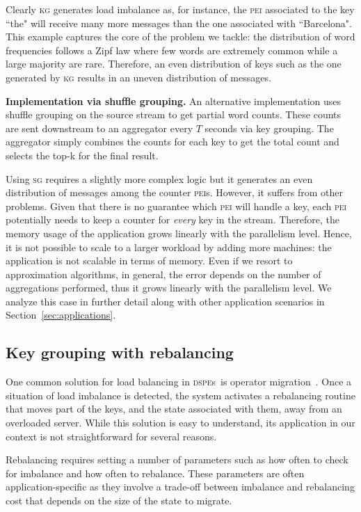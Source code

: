 \documentclass[10pt,conference,letterpaper]{IEEEtran}
\newcommand{\spara}[1]{\smallskip\noindent\textbf{#1}}
\newcommand{\pei}{\textsc{pei}\xspace}
\newcommand{\peis}{{\pei}s\xspace}
\newcommand{\dspe}{\textsc{dspe}\xspace}
\newcommand{\dspes}{{\dspe}s\xspace}
\newcommand{\kg}{\textsc{kg}\xspace}
\newcommand{\sg}{\textsc{sg}\xspace}
\begin{document}
Clearly \kg generates load imbalance as, for instance, the \pei associated to the key ``the" will receive many more messages than the one associated with ``Barcelona".
This example captures the core of the problem we tackle: the distribution of word frequencies follows a Zipf law where few words are extremely common while a large majority are rare.
Therefore, an even distribution of keys such as the one generated by \kg results in an uneven distribution of messages.

\spara{Implementation via shuffle grouping.} An alternative implementation uses shuffle grouping on the source stream to get partial word counts.
These counts are sent downstream to an aggregator every $T$ seconds via key grouping.
The aggregator simply combines the counts for each key to get the total count and selects the top-k for the final result.


Using \sg requires a slightly more complex logic but it generates an even distribution of messages among the counter \peis.
However, it suffers from other problems.
Given that there is no guarantee which \pei will handle a key, each \pei potentially needs to keep a counter for \emph{every} key in the stream.
Therefore, the memory usage of the application grows linearly with the parallelism level.
Hence, it is not possible to scale to a larger workload by adding more machines: the application is not scalable in terms of memory.
Even if we resort to approximation algorithms, in general, the error depends on the number of aggregations performed, thus it grows linearly with the parallelism level.
We analyze this case in further detail along with other application scenarios in Section~\ref{sec:applications}.



\subsection{Key grouping with rebalancing}
One common solution for load balancing in \dspes\ is operator migration~\citep{shah2003flux,cherniack2003scalable,xing2005dynamic,gedik2013partitioning,balkesen2013adaptive,castro2013integrating}.
Once a situation of load imbalance is detected, the system activates a rebalancing routine that moves part of the keys, and the state associated with them, away from an overloaded server.
While this solution is easy to understand, its application in our context is not straightforward for several reasons.



Rebalancing requires setting a number of parameters such as how often to check for imbalance and how often to rebalance.
These parameters are often application-specific as they involve a trade-off between imbalance and rebalancing cost that depends on the size of the state to migrate. 
\end{document}
